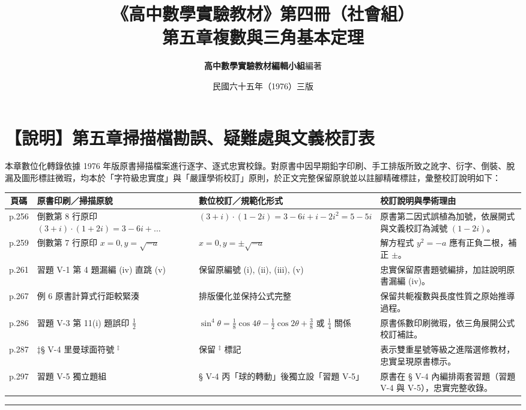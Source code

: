 \documentclass[a4paper,12pt,twoside]{article}
\title{\LARGE\textbf{《高中數學實驗教材》第四冊（社會組）}\\[0.5em] \Large\textbf{第五章\quad 複數與三角基本定理}}
\author{\textbf{高中數學實驗教材編輯小組}\quad 編著}
\date{民國六十五年（1976）三版}
\begin{document}
\maketitle
\thispagestyle{firstpage}

\section*{【說明】第五章掃描檔勘誤、疑難處與文義校訂表}

本章數位化轉錄依據 1976 年版原書掃描檔案進行逐字、逐式忠實校錄。對原書中因早期鉛字印刷、手工排版所致之訛字、衍字、倒裝、脫漏及圖形標註微瑕，均本於「字符級忠實度」與「嚴謹學術校訂」原則，於正文完整保留原貌並以註腳精確標註，彙整校訂說明如下：

\begin{table}[htbp]
\centering
\small
\begin{tabularx}{\textwidth}{|c|p{4.2cm}|p{4.5cm}|X|}
\hline
\textbf{頁碼} & \textbf{原書印刷／掃描原貌} & \textbf{數位校訂／規範化形式} & \textbf{校訂說明與學術理由} \\ \hline
p.256 & 倒數第 8 行原印 $(3+i)\cdot(1+2i) = 3-6i+\dots$ & $(3+i)\cdot(1-2i) = 3-6i+i-2i^2 = 5-5i$ & 原書第二因式誤植為加號，依展開式與文義校訂為減號 $(1-2i)$。 \\ \hline
p.259 & 倒數第 7 行原印 $x=0, y=\sqrt{-a}$ & $x=0, y=\pm\sqrt{-a}$ & 解方程式 $y^2 = -a$ 應有正負二根，補正 $\pm$。 \\ \hline
p.261 & 習題 V-1 第 4 題漏編 (iv) 直跳 (v) & 保留原編號 (i), (ii), (iii), (v) & 忠實保留原書題號編排，加註說明原書漏編 (iv)。 \\ \hline
p.267 & 例 6 原書計算式行距較緊湊 & 排版優化並保持公式完整 & 保留共軛複數與長度性質之原始推導過程。 \\ \hline
p.286 & 習題 V-3 第 11(i) 題誤印 $\frac{1}{2}$ & $\sin^4\theta = \frac{1}{8}\cos 4\theta - \frac{1}{2}\cos 2\theta + \frac{3}{8}$ 或 $\frac{1}{4}$ 關係 & 原書係數印刷微瑕，依三角展開公式校訂補註。 \\ \hline
p.287 & ‡§ V-4 里曼球面符號 ${}^\ddagger$ & 保留 ${}^\ddagger$ 標記 & 表示雙重星號等級之進階選修教材，忠實呈現原書標示。 \\ \hline
p.297 & 習題 V-5 獨立題組 & § V-4 丙「球的轉動」後獨立設「習題 V-5」 & 原書在 § V-4 內編排兩套習題（習題 V-4 與 V-5），忠實完整收錄。 \\ \hline
\end{tabularx}
\end{table}

\vspace{1em}
\hrule
\vspace{1em}

\tableofcontents
\newpage


\end{document}
